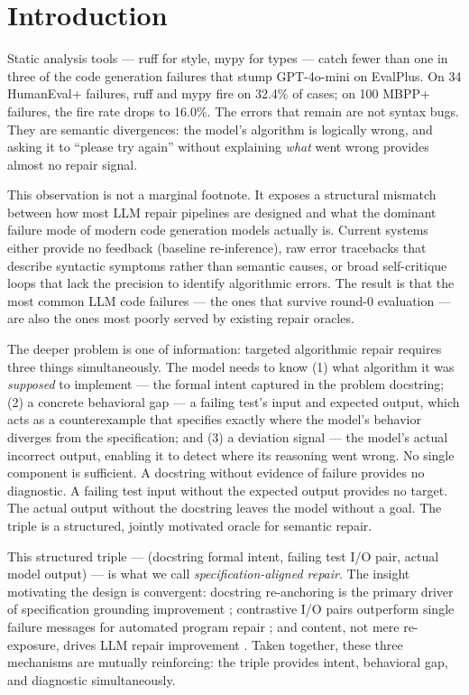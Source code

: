 \section{Introduction}

Static analysis tools --- ruff for style, mypy for types --- catch fewer than one in three
of the code generation failures that stump GPT-4o-mini on EvalPlus. On 34 HumanEval+
failures, ruff and mypy fire on 32.4\% of cases; on 100 MBPP+ failures, the fire rate
drops to 16.0\%. The errors that remain are not syntax bugs. They are semantic
divergences: the model's algorithm is logically wrong, and asking it to ``please try
again'' without explaining \textit{what} went wrong provides almost no repair signal.

This observation is not a marginal footnote. It exposes a structural mismatch between
how most LLM repair pipelines are designed and what the dominant failure mode of modern
code generation models actually is. Current systems either provide no feedback
(baseline re-inference), raw error tracebacks that describe syntactic symptoms rather
than semantic causes, or broad self-critique loops that lack the precision to identify
algorithmic errors. The result is that the most common LLM code failures --- the ones
that survive round-0 evaluation --- are also the ones most poorly served by existing
repair oracles.

The deeper problem is one of information: targeted algorithmic repair requires three
things simultaneously. The model needs to know (1) what algorithm it was \textit{supposed}
to implement --- the formal intent captured in the problem docstring; (2) a concrete
behavioral gap --- a failing test's input and expected output, which acts as a
counterexample that specifies exactly where the model's behavior diverges from the
specification; and (3) a deviation signal --- the model's actual incorrect output,
enabling it to detect where its reasoning went wrong. No single component is
sufficient. A docstring without evidence of failure provides no diagnostic. A failing
test input without the expected output provides no target. The actual output without
the docstring leaves the model without a goal. The triple is a structured, jointly
motivated oracle for semantic repair.

This structured triple --- (docstring formal intent, failing test I/O pair, actual model
output) --- is what we call \textit{specification-aligned repair}. The insight motivating the
design is convergent: docstring re-anchoring is the primary driver of specification
grounding improvement \citep{Haeri2026}; contrastive I/O pairs outperform
single failure messages for automated program repair \citep{Kong2024}; and content,
not mere re-exposure, drives LLM repair improvement \citep{Iscan2026}. Taken together,
these three mechanisms are mutually reinforcing: the triple provides intent,
behavioral gap, and diagnostic simultaneously.

